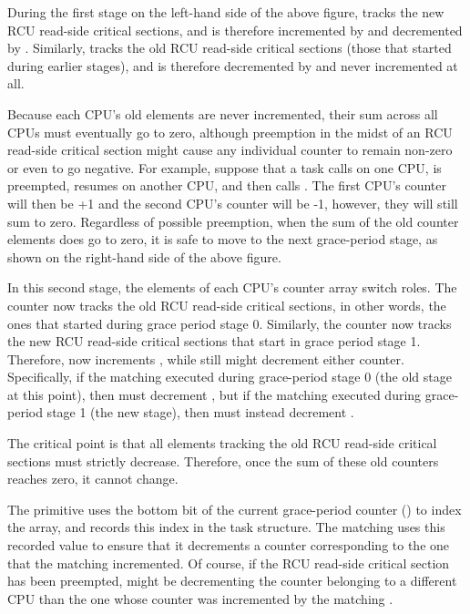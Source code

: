 During the first stage on the left-hand side of the above figure,
 tracks the new
RCU read-side critical sections, and is therefore incremented by
 and decremented by .
Similarly,  tracks the old RCU read-side
critical sections (those that started during earlier stages), and
is therefore decremented by  and never
incremented at all.

Because each CPU's old  elements are never
incremented, their sum across all CPUs must eventually go to zero,
although preemption in the midst of an RCU read-side critical section might
cause any individual counter to remain non-zero or even to go negative.
For example, suppose that a task calls  on
one CPU, is preempted, resumes on another CPU, and then calls
.
The first CPU's counter will then be +1 and the second CPU's counter
will be -1, however, they will still sum to zero.
Regardless of possible preemption, when the sum of the old counter
elements does go to zero, it is safe to move to the next grace-period
stage, as shown on the right-hand side of the above figure.

In this second stage, the elements of each CPU's 
counter array switch roles.
The  counter now tracks the old RCU read-side
critical sections, in other words, the ones that started during
grace period stage 0.
Similarly, the  counter now tracks the new
RCU read-side critical sections that start in grace period stage 1.
Therefore,  now increments
, while  still
might decrement either counter.
Specifically, if the matching  executed
during grace-period stage 0 (the old stage at this point), then
 must decrement ,
but if the matching  executed during
grace-period stage 1 (the new stage), then 
must instead decrement .

The critical point is that all  elements
tracking the old RCU read-side critical sections must strictly decrease.
Therefore, once the sum of these old counters reaches zero,
it cannot change.

The  primitive uses the bottom
bit of the current grace-period counter
() to index the
 array,
and records this index in the task structure.
The matching  uses this recorded
value to ensure that it decrements a counter corresponding to
the one that the matching  incremented.
Of course, if the RCU read-side critical section has been preempted,
 might be decrementing the counter
belonging to a different CPU than the one whose counter was incremented
by the matching .

